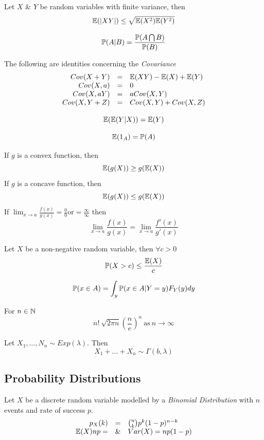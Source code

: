 \documentclass[11pt,a4paper]{article}
\begin{document}
Let $X$ \& $Y$ be random variables with finite variance, then
$$\mathbb{E}(|XY|)\leq\sqrt{\mathbb{E}(X^2)\mathbb{E}(Y^2)}$$

$$\mathbb{P}(A|B)=\dfrac{\mathbb{P}(A\bigcap B)}{\mathbb{P}(B)}$$

The following are identities concerning the \textit{Covariance}
\[\begin{array}{rcl}
Cov(X+Y)&=&\mathbb{E}(XY)-\mathbb{E}(X)+\mathbb{E}(Y)\\
Cov(X,a)&=&0\\
Cov(X,aY)&=&aCov(X,Y)\\
Cov(X,Y+Z)&=&Cov(X,Y)+Cov(X,Z)
\end{array}\]

$$\mathbb{E}(\mathbb{E}(Y|X))=\mathbb{E}(Y)$$

$$\mathbb{E}(1_A)=\mathbb{P}(A)$$

If $g$ is a convex function, then
$$\mathbb{E}(g(X))\geq g(\mathbb{E}(X))$$
If $g$ is a concave function, then
$$\mathbb{E}(g(X))\leq g(\mathbb{E}(X))$$
If $\lim_{x\to a}\frac{f(x)}{g(x)}=\frac{0}{0}$or$=\frac{\infty}{\infty}$ then
$$\lim_{x\to a}\frac{f(x)}{g(x)}=\lim_{x\to a}\frac{f'(x)}{g'(x)}$$

Let $X$ be a non-negative random variable, then $\forall c>0$
$$\mathbb{P}(X>c)\leq\frac{\mathbb{E}(X)}{c}$$

$$\mathbb{P}(x\in A)=\int_y\mathbb{P}(x\in A|Y=y)F_Y(y)dy$$

For $n\in\mathbb{N}$
$$n!~\sqrt{2\pi n}\left(\frac{n}{e}\right)^n\ \mathrm{as}\ n\rightarrow\infty$$

Let $X_1,\dots,N_n\sim Exp(\lambda)$. Then
$$X_1+\dots+X_n\sim\Gamma(b,\lambda)$$

\subsection{Probability Distributions}

Let $X$ be a discrete random variable modelled by a \textit{Binomial Distribution} with $n$ events and rate of success $p$.\\
\[\begin{array}{rcl}
p_X(k)&=&{n\choose k}p^k(1-p)^{n-k}\\
\mathbb{E}(X)np=&\&&Var(X)=np(1-p)
\end{array}\]
\end{document}
